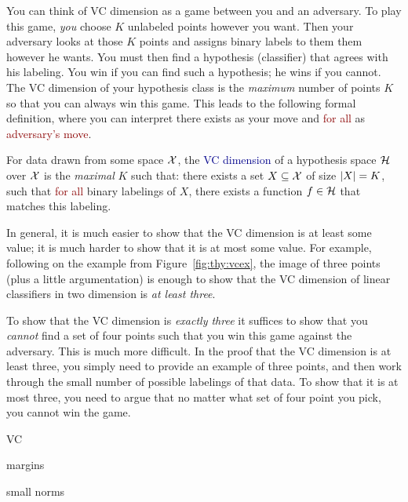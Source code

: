 
You can think of VC dimension as a game between you and an adversary.
To play this game, \emph{you} choose $K$ unlabeled points however you
want.  Then your adversary looks at those $K$ points and assigns
binary labels to them them however he wants.  You must then find a
hypothesis (classifier) that agrees with his labeling.  You win if you
can find such a hypothesis; he wins if you cannot.  The VC dimension
of your hypothesis class is the \emph{maximum} number of points $K$ so
that you can always win this game.  This leads to the following formal
definition, where you can interpret \textcolor{darkergreen}{there
  exists} as \textcolor{darkergreen}{your move} and
\textcolor{darkred}{for all} as \textcolor{darkred}{adversary's move}.

\begin{definition} \label{def:thy:vc} For data drawn from some space
  $\mathcal{X}$, the \textcolor{darkblue}{VC dimension} of a hypothesis space
  $\mathcal{H}$ over $\mathcal{X}$ is the \emph{maximal} $K$ such that:
  \textcolor{darkergreen}{there exists} a set $X \subseteq \mathcal{X}$ of
  size $\left\vert X \right\vert=K$, such that \textcolor{darkred}{for all} binary
  labelings of $X$, \textcolor{darkergreen}{there exists} a function
  $f \in \mathcal{H}$ that matches this labeling.
\end{definition}

In general, it is much easier to show that the VC dimension is at
least some value; it is much harder to show that it is at most some
value.  For example, following on the example from
Figure~\ref{fig:thy:vcex}, the image of three points (plus a little
argumentation) is enough to show that the VC dimension of linear
classifiers in two dimension is \emph{at least three}.

To show that the VC dimension is \emph{exactly three} it suffices to
show that you \emph{cannot} find a set of four points such that you
win this game against the adversary.  This is much more difficult.  In
the proof that the VC dimension is at least three, you simply need to
provide an example of three points, and then work through the small
number of possible labelings of that data.  To show that it is at most
three, you need to argue that no matter what set of four point you
pick, you cannot win the game.



VC

margins

small norms

